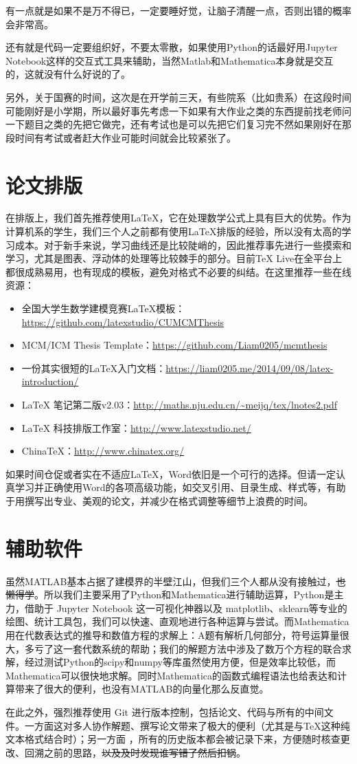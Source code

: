 \documentclass{ctexart}
\begin{document}
有一点就是如果不是万不得已，一定要睡好觉，让脑子清醒一点，否则出错的概率会非常高。

还有就是代码一定要组织好，不要太零散，如果使用Python的话最好用Jupyter Notebook这样的交互式工具来辅助，当然Matlab和Mathematica本身就是交互的，这就没有什么好说的了。

另外，关于国赛的时间，这次是在开学前三天，有些院系（比如贵系）在这段时间可能刚好是小学期，所以最好事先考虑一下如果有大作业之类的东西提前找老师问一下题目之类的先把它做完，还有考试也是可以先把它们复习完不然如果刚好在那段时间有考试或者赶大作业可能时间就会比较紧张了。

\section{论文排版}
在排版上，我们首先推荐使用\LaTeX{}，它在处理数学公式上具有巨大的优势。作为计算机系的学生，我们三个人之前都有使用\LaTeX{}排版的经验，所以没有太高的学习成本。对于新手来说，学习曲线还是比较陡峭的，因此推荐事先进行一些摸索和学习，尤其是图表、浮动体的处理等比较棘手的部分。目前\TeX{} Live在全平台上都很成熟易用，也有现成的模板，避免对格式不必要的纠结。在这里推荐一些在线资源：

\begin{itemize}
  \item 全国大学生数学建模竞赛\LaTeX{}模板：\url{https://github.com/latexstudio/CUMCMThesis}
  \item MCM/ICM Thesis Template：\url{https://github.com/Liam0205/mcmthesis}
  \item 一份其实很短的\LaTeX{}入门文档：\url{https://liam0205.me/2014/09/08/latex-introduction/}
  \item \LaTeX{} 笔记第二版v2.03：\url{http://maths.nju.edu.cn/~meijq/tex/lnotes2.pdf}
  \item \LaTeX{} 科技排版工作室：\url{http://www.latexstudio.net/}
  \item China\TeX{}：\url{http://www.chinatex.org/}
\end{itemize}

如果时间仓促或者实在不适应\LaTeX{}，Word依旧是一个可行的选择。但请一定认真学习并正确使用Word的各项高级功能，如交叉引用、目录生成、样式等，有助于用撰写出专业、美观的论文，并减少在格式调整等细节上浪费的时间。

\section{辅助软件}
虽然MATLAB基本占据了建模界的半壁江山，但我们三个人都从没有接触过，\sout{也懒得学}。所以我们主要采用了Python和Mathematica进行辅助运算，Python是主力，借助于 Jupyter Notebook 这一可视化神器以及 matplotlib、sklearn等专业的绘图、统计工具包，我们可以快速、直观地进行各种运算与尝试。而Mathematica用在代数表达式的推导和数值方程的求解上：A题有解析几何部分，符号运算量很大，多亏了这一套代数系统的帮助；我们的解题方法中涉及了数万个方程的联合求解，经过测试Python的scipy和numpy等库虽然使用方便，但是效率比较低，而Mathematica可以很快地求解。同时Mathematica的函数式编程语法也给表达和计算带来了很大的便利，也没有MATLAB的向量化那么反直觉。

在此之外，强烈推荐使用 Git 进行版本控制，包括论文、代码与所有的中间文件。一方面这对多人协作解题、撰写论文带来了极大的便利（尤其是与\TeX{}这种纯文本格式结合时）；另一方面 ，所有的历史版本都会被记录下来，方便随时核查更改、回溯之前的思路，\sout{以及及时发现谁写错了然后扣锅}。
\end{document}
